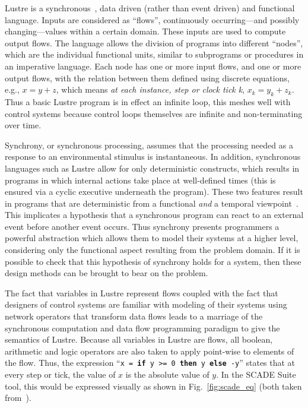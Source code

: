 Lustre is a synchronous~\cite{halbwachs@ieee03}, data driven (rather
than event driven) and functional language. Inputs are considered as
``flows'', continuously occurring---and possibly changing---values
within a certain domain. These inputs are used to compute output
flows. The language allows the division of programs into different
``nodes'', which are the individual functional units, similar to
subprograms or procedures in an imperative language. Each node has one
or more input flows, and one or more output flows, with the relation
between them defined using discrete equations, e.g., $x = y + z$,
which means \emph{at each instance, step or clock tick k}, $x_k = y_k
+ z_k$. Thus a basic Lustre program is in effect an infinite loop,
this meshes well with control systems because control loops themselves
are infinite and non-terminating over time.

Synchrony, or synchronous processing, assumes that the processing
needed as a response to an environmental stimulus is instantaneous. In
addition, synchronous languages such as Lustre allow for only
deterministic constructs, which results in programs in which internal
actions take place at well-defined times (this is ensured via a cyclic
executive underneath the program). These two features result in
programs that are deterministic from a functional \emph{and} a
temporal viewpoint~\cite{halbwachs@ieee91}. This implicates a
hypothesis that a synchronous program can react to an external event
before another event occurs. Thus synchrony presents programmers a
powerful abstraction which allows them to model their systems at a
higher level, considering only the functional aspect resulting from
the problem domain. If it is possible to check that this hypothesis of
synchrony holds for a system, then these design methods can be brought
to bear on the problem.

The fact that variables in Lustre represent flows coupled with the
fact that designers of control systems are familiar with modeling of
their systems using network operators that transform data flows leads
to a marriage of the synchronous computation and data flow programming
paradigm to give the semantics of Lustre. Because all variables in
Lustre are flows, all boolean, arithmetic and logic operators are also
taken to apply point-wise to elements of the flow. Thus, the
expression ``\texttt{x = \textbf{if} y >= 0 \textbf{then} y
  \textbf{else} -y}'' states that at every step or tick, the value of
$x$ is the absolute value of $y$. In the SCADE Suite tool, this would
be expressed visually as shown in Fig.~\ref{fig:scade_eq} (both taken
from~\cite{halbwachs@ieee03}).


